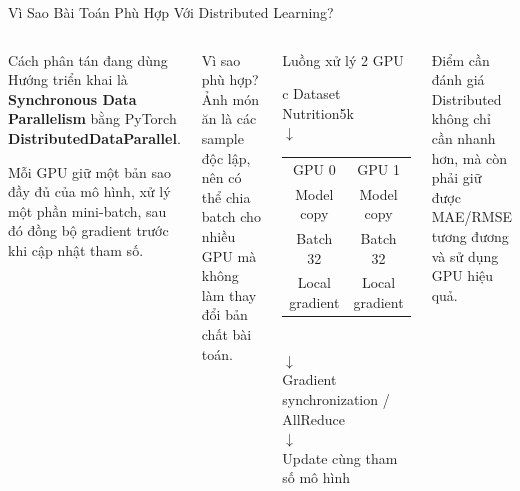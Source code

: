 \documentclass[10pt,aspectratio=169]{beamer}
\newcommand{\kw}[1]{\textcolor{uitblue}{\bfseries #1}}
\begin{document}
\begin{frame}{Vì Sao Bài Toán Phù Hợp Với Distributed Learning?}
\scriptsize
\begin{columns}[T]
\begin{uitbox}{Cách phân tán đang dùng}
Hướng triển khai là \kw{Synchronous Data Parallelism} bằng PyTorch \kw{DistributedDataParallel}.

\vspace{0.08cm}
Mỗi GPU giữ một bản sao đầy đủ của mô hình, xử lý một phần mini-batch, sau đó đồng bộ gradient trước khi cập nhật tham số.
\end{uitbox}

\vspace{0.12cm}
\begin{greenbox}{Vì sao phù hợp?}
Ảnh món ăn là các sample độc lập, nên có thể chia batch cho nhiều GPU mà không làm thay đổi bản chất bài toán.
\end{greenbox}

\begin{accentbox}{Luồng xử lý 2 GPU}
\centering
\begin{tabular}{c}
Dataset Nutrition5k \\
$\downarrow$ \\
\begin{tabular}{cc}
GPU 0 & GPU 1 \\
Model copy & Model copy \\
Batch 32 & Batch 32 \\
Local gradient & Local gradient \\
\end{tabular} \\
$\downarrow$ \\
Gradient synchronization / AllReduce \\
$\downarrow$ \\
Update cùng tham số mô hình
\end{tabular}
\end{accentbox}
\vspace{0.1cm}
\begin{redbox}{Điểm cần đánh giá}
Distributed không chỉ cần nhanh hơn, mà còn phải giữ được MAE/RMSE tương đương và sử dụng GPU hiệu quả.
\end{redbox}
\end{columns}
\end{frame}
\end{document}
